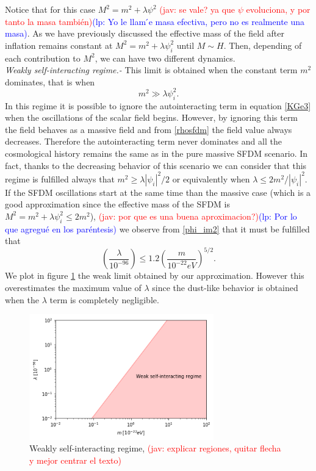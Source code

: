\documentclass[amssymb,twocolumn,prd,nofootinbib,showpacs]{revtex4-1}
\newcommand{\jav}[1]{\textcolor{red}{(jav: #1)}}
\newcommand{\lp}[1]{\textcolor{blue}{(lp: #1)}}
\begin{document}
Notice that for this case $M^2=m^2+\lambda\psi^2$ \jav{se vale? ya que $\psi$ 
evoluciona, y por tanto la masa también}\lp{Yo le llam ́e masa efectiva,
pero no es realmente una masa}. 
As we have previously discussed the effective mass of the field after inflation remains 
constant at $M^2=m^2+\lambda\psi_i^2$ until $M\sim H$. Then, depending of each contribution to $M^2$, we can 
have two different dynamics. 
\\

\textit{Weakly self-interacting regime.-} This limit is obtained when the constant term $m^2$ dominates, 
that is when
%
\begin{equation}\label{consw}
m^2\gg \lambda\psi_i^2.
\end{equation}
In this regime it is possible to ignore the autointeracting term in equation \eqref{KGe3} when the oscillations 
of the scalar field begins. 
However, by ignoring this term the field behaves as a massive field and from
\eqref{rhosfdm} the field value always decreases. Therefore the autointeracting term never dominates and 
all the cosmological history remains the same as in the pure massive SFDM scenario.  In fact, thanks to the 
decreasing behavior of this scenario we can consider that this regime is fulfilled always that 
$m^2\geq \lambda|\psi_i|^2/2$ or equivalently when $\lambda\leq 2m^2/|\psi_i|^2$. 
%
If the SFDM oscillations start at the same time than the massive case (which is a good approximation since the effective mass of the SFDM is $M^2 =m^2 +\lambda\psi^2_i \leq 2m^2$), \jav{por que es una buena aproximacion?}\lp{Por lo que agregu\'e en los par\'entesis} we observe from \eqref{phi_im2} that it must be fulfilled that
%
\begin{equation}
\left(\frac{\lambda}{10^{-96}}\right)\leq 1.2\left(\frac{m}{10^{-22}eV}\right)^{5/2}.
\end{equation}
We plot in figure \ref{weekregime} the weak limit obtained by our approximation. However this overestimates the maximum value of $\lambda$ since the dust-like behavior is obtained when the $\lambda$ term is completely negligible.%
\begin{figure}[h!]
\includegraphics[width=8cm]{weakregime.png}
\caption{Weakly self-interacting regime, \jav{explicar regiones, quitar flecha y mejor centrar el texto}}
\label{weekregime}
\end{figure} 
\end{document}
